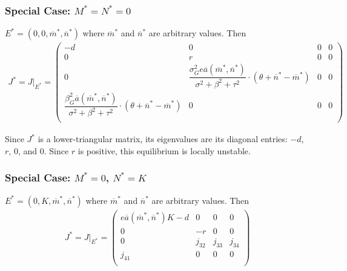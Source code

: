 \documentclass[12pt]{article}
\begin{document}
							\subsubsection{Special Case: $M^* = N^* = 0$}

$E^* = (0, 0, \overline{m}^*, \overline{n}^*)$ where $\overline{m}^*$ and $\overline{n}^*$ are arbitrary values.  Then
\begin{align*}
	J^* = J\big|_{E^*} = \left(
	\begin{array}{cccc}
		-d & 0 & 0 & 0 \\[.4cm]
		0 & r & 0 & 0 \\[.4cm]
		0 & \dfrac{\sigma_G^2e\overline{a}(\overline{m}^*, \overline{n}^*)}{\sigma^2 + \beta^2 + \tau^2} \cdot (\theta + \overline{n}^* - \overline{m}^*) & 0 & 0 \\[.4cm]
		\dfrac{\beta_G^2\overline{a}(\overline{m}^*, \overline{n}^*)}{\sigma^2 + \beta^2 + \tau^2} \cdot (\theta + \overline{n}^* - \overline{m}^*) & 0 & 0 & 0 \\
	\end{array}
	\right)
\end{align*}

\vskip 10pt

\noindent Since $J^*$ is a lower-triangular matrix, its eigenvalues are its diagonal entries: $-d$, $r$, $0$, and $0$.  Since $r$ is positive, this equilibrium is locally unstable.

							\subsubsection{Special Case: $M^* = 0$, $N^* = K$}

$E^* = (0, K, \overline{m}^*, \overline{n}^*)$ where $\overline{m}^*$ and $\overline{n}^*$ are arbitrary values.  Then
\begin{align*}
	J^* = J\big|_{E^*} = \left(
	\begin{array}{cccc}
		e\overline{a}(\overline{m}^*, \overline{n}^*)K - d & 0 & 0 & 0 \\[.4cm]
		0 & -r & 0 & 0 \\[.4cm]
		0 & j_{32} & j_{33} & j_{34} \\[.4cm]
		j_{41} & 0 & 0 & 0 \\
	\end{array}
	\right)
\end{align*}
\end{document}

